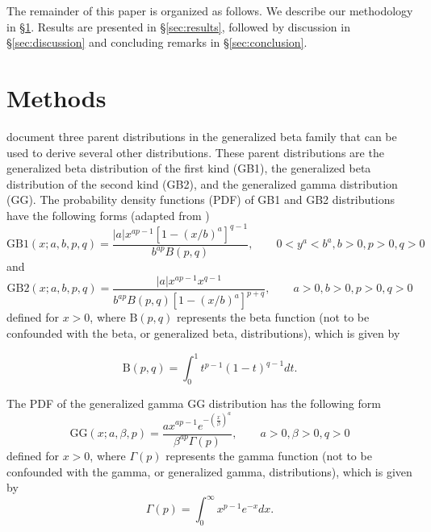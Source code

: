 \message{ !name(pspdistfit_article.tex)}\documentclass{article}
\begin{document}
The remainder of this paper is organized as follows.
We describe our methodology in \S\ref{sec:methods}. 
Results are presented in \S\ref{sec:results}, followed by discussion in \S\ref{sec:discussion} and concluding remarks in \S\ref{sec:conclusion}.

\section{Methods}
\label{sec:methods}

\citet{ducey2015sizebiased} document three parent distributions in the generalized beta family that can be used to derive several other distributions.
These parent distributions are the generalized beta distribution of the first kind (GB1), the generalized beta distribution of the second kind (GB2), and the generalized gamma distribution (GG).
The probability density functions (PDF) of GB1 and GB2 distributions have the following forms (adapted from \citealp{ducey2015sizebiased})
\begin{equation}
\text{GB1}(x; a, b, p, q) = \frac{|a|x^{ap-1}\left[1 - (x/b)^a\right]^{q-1}}{b^{ap}B(p, q)}, \qquad 0 < y^a < b^a, b > 0, p > 0, q > 0
\end{equation}
and 
\begin{equation}
\text{GB2}(x; a, b, p, q) = \frac{|a|x^{ap-1}x^{q-1}}{b^{ap}B(p, q)\left[1 - (x/b)^a\right]^{p+q}}, \qquad a > 0, b > 0, p > 0, q > 0
\end{equation}
defined for $x > 0$, where $\text{B}(p, q)$ represents the beta function (not to be confounded with the beta, or generalized beta, distributions), which is given by

\begin{equation}
\text{B}(p, q) = \int_0^1 t^{p-1} (1 - t)^{q-1} dt.
\end{equation}

The PDF of the generalized gamma GG distribution has the following form
\begin{equation}
\text{GG}(x; a, \beta, p) = \frac{ax^{ap-1}e^{-\left(\frac{x}{\beta}\right)^a}}{\beta^{ap}\Gamma(p)}, \qquad a > 0, \beta > 0, q > 0
\end{equation}
defined for $x > 0$, where $\Gamma(p)$ represents the gamma function (not to be confounded with the gamma, or generalized gamma, distributions), which is given by
\begin{equation}
\Gamma(p) = \int_0^\infty x^{p-1}e^{-x} dx.
\end{equation}
\end{document}
